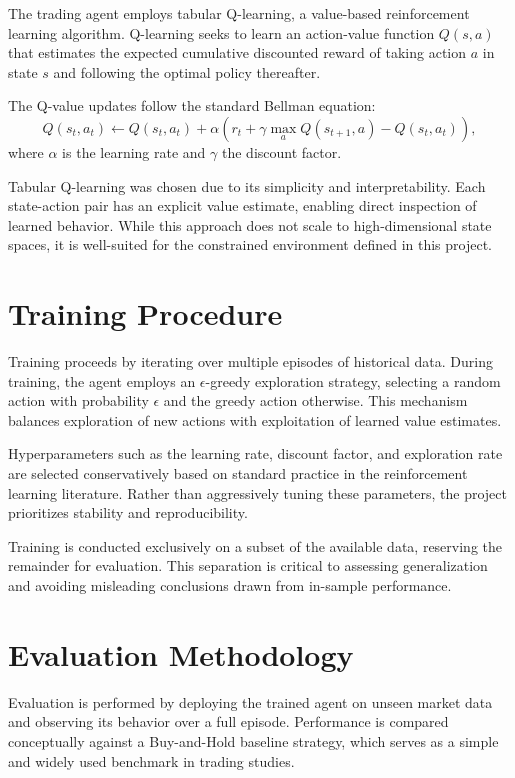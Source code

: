 \documentclass[12pt]{report}
\begin{document}
The trading agent employs tabular Q-learning, a value-based reinforcement learning algorithm. Q-learning seeks to learn an action-value function $Q(s,a)$ that estimates the expected cumulative discounted reward of taking action $a$ in state $s$ and following the optimal policy thereafter.

The Q-value updates follow the standard Bellman equation:
\[
Q(s_t, a_t) \leftarrow Q(s_t, a_t) + \alpha \left( r_t + \gamma \max_a Q(s_{t+1}, a) - Q(s_t, a_t) \right),
\]
where $\alpha$ is the learning rate and $\gamma$ the discount factor.

Tabular Q-learning was chosen due to its simplicity and interpretability. Each state-action pair has an explicit value estimate, enabling direct inspection of learned behavior. While this approach does not scale to high-dimensional state spaces, it is well-suited for the constrained environment defined in this project.

\chapter{Training Procedure}

Training proceeds by iterating over multiple episodes of historical data. During training, the agent employs an $\epsilon$-greedy exploration strategy, selecting a random action with probability $\epsilon$ and the greedy action otherwise. This mechanism balances exploration of new actions with exploitation of learned value estimates.

Hyperparameters such as the learning rate, discount factor, and exploration rate are selected conservatively based on standard practice in the reinforcement learning literature. Rather than aggressively tuning these parameters, the project prioritizes stability and reproducibility.

Training is conducted exclusively on a subset of the available data, reserving the remainder for evaluation. This separation is critical to assessing generalization and avoiding misleading conclusions drawn from in-sample performance.

\chapter{Evaluation Methodology}

Evaluation is performed by deploying the trained agent on unseen market data and observing its behavior over a full episode. Performance is compared conceptually against a Buy-and-Hold baseline strategy, which serves as a simple and widely used benchmark in trading studies.
\end{document}
